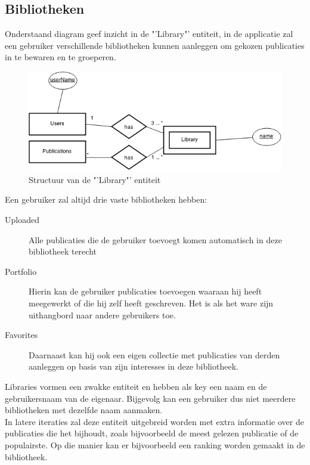 \documentclass{article}
\begin{document}
\subsection{Bibliotheken}

Onderstaand diagram geef inzicht in de "'Library"' entiteit, in de applicatie zal een gebruiker verschillende bibliotheken kunnen aanleggen om gekozen publicaties in te bewaren en te groeperen. 
\begin{figure}[!h]
\centering
 \includegraphics[width=145mm]{library_diagram.png}
 \caption{Structuur van de "'Library"' entiteit}
 \label{Library-model}
\end{figure}

Een gebruiker zal altijd drie vaste bibliotheken hebben:

\begin{description}

\item[Uploaded] Alle publicaties die de gebruiker toevoegt komen automatisch in deze bibliotheek terecht

\item[Portfolio] Hierin kan de gebruiker publicaties toevoegen waaraan hij heeft meegewerkt of die hij zelf heeft geschreven. Het is als het ware zijn uithangbord naar andere gebruikers toe.

\item[Favorites] Daarnaast kan hij ook een eigen collectie met publicaties van derden aanleggen op basis van zijn interesses in deze bibliotheek.

\end{description}

Libraries vormen een zwakke entiteit en hebben als key een naam en de gebruikersnaam van de eigenaar. Bijgevolg kan een gebruiker dus niet meerdere bibliotheken met dezelfde naam aanmaken. \\

In latere iteraties zal deze entiteit uitgebreid worden met extra informatie over de publicaties die het bijhoudt, zoals bijvoorbeeld de meest gelezen publicatie of de populairste. Op die manier kan er bijvoorbeeld een ranking worden gemaakt in de bibliotheek. \\
\end{document}
